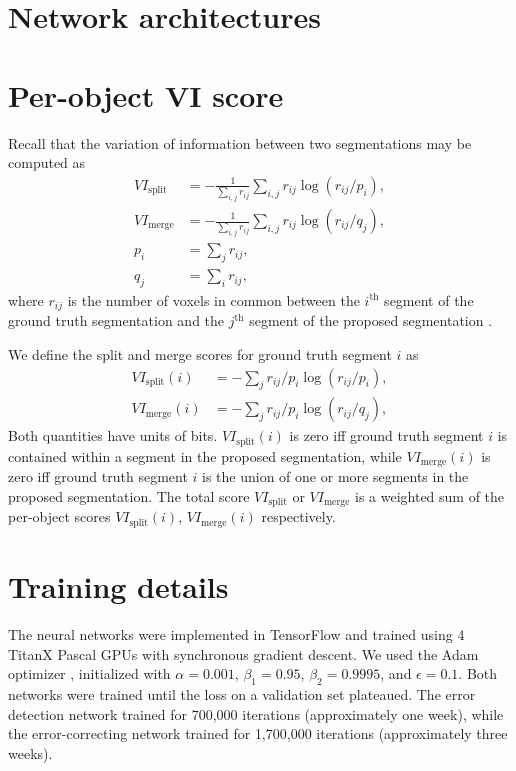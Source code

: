 \documentclass{article}
\begin{document}
\begin{appendices}
\section{Network architectures}
\label{appendix:architecture}



\section{Per-object VI score}
\label{appendix:vi}
 Recall that the variation of information between two segmentations may be computed as
\begin{align*}
	VI_\text{split}&=-\frac 1 {\sum_{i,j} r_{ij}} \sum_{i,j} r_{ij} \log(r_{ij}/p_i),\\
	VI_\text{merge}&=-\frac 1 {\sum_{i,j} r_{ij}} \sum_{i,j} r_{ij} \log(r_{ij}/q_j),\\
	p_i&=\sum_j r_{ij},\\
	q_j&=\sum_i r_{ij},
\end{align*}
where $r_{ij}$ is the number of voxels in common between the $i^\text{th}$ segment of the ground truth segmentation and the $j^\text{th}$ segment of the proposed segmentation \cite{vi}.

We define the split and merge scores for ground truth segment $i$ as
\begin{align*}
	VI_\text{split}(i) &= -\sum_j r_{ij}/p_i \log(r_{ij}/p_i),\\
	VI_\text{merge}(i) &= -\sum_j r_{ij}/p_i \log(r_{ij}/q_j),
\end{align*}
Both quantities have units of bits. $VI_\text{split}(i)$ is zero iff ground truth segment $i$ is contained within a segment in the proposed segmentation, while $VI_\text{merge}(i)$ is zero iff ground truth segment $i$ is the union of one or more segments in the proposed segmentation. The total score $VI_\text{split}$ or $VI_\text{merge}$ is a weighted sum of the per-object scores $VI_\text{split}(i)$, $VI_\text{merge}(i)$ respectively.


\section{Training details}
The neural networks were implemented in TensorFlow \cite{tensorflow} and trained using 4 TitanX Pascal GPUs with synchronous gradient descent. We used the Adam optimizer \cite{adam}, initialized with $\alpha=0.001$, $\beta_1=0.95$, $\beta_2=0.9995$, and $\epsilon=0.1$. Both networks were trained until the loss on a validation set plateaued. The error detection network trained for 700,000 iterations (approximately one week), while the error-correcting network trained for 1,700,000 iterations (approximately three weeks).

\end{appendices}


\end{document}

